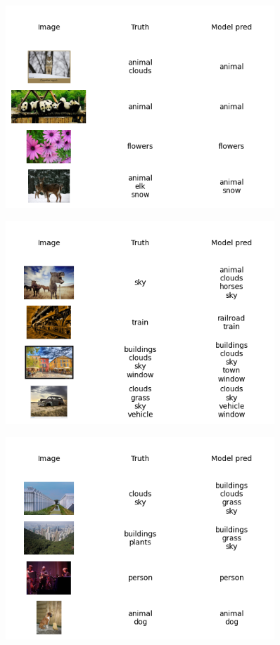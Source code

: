 \documentclass{udstu}
\begin{document}
\begin{figure}[!ht]
	\centering
	\includegraphics[width=0.9\textwidth]{PNG/showcase-125}
	\caption{}
\end{figure}

\begin{figure}[!ht]
	\centering
	\includegraphics[width=0.9\textwidth]{PNG/showcase-150}
	\caption{}
\end{figure}

\begin{figure}[!ht]
	\centering
	\includegraphics[width=0.9\textwidth]{PNG/showcase-175}
	\caption{}
\end{figure}
\end{document}
